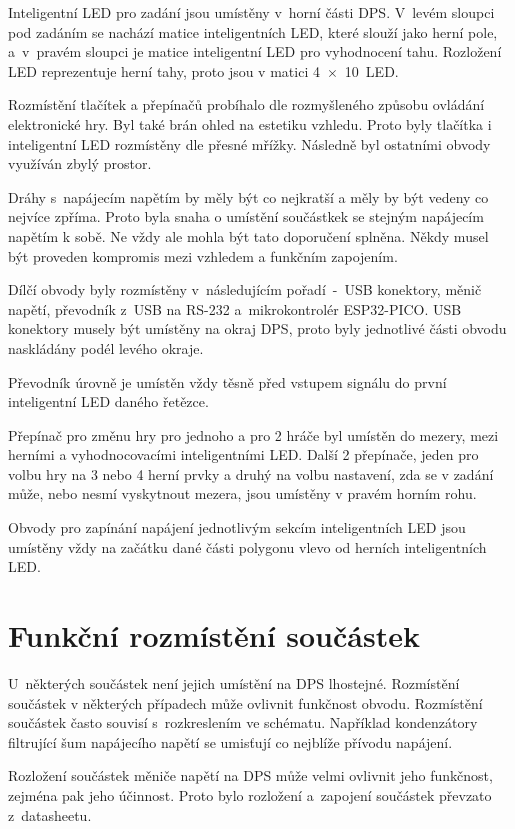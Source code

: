   Inteligentní LED pro zadání jsou umístěny v~horní části DPS. V~levém sloupci pod zadáním se nachází matice inteligentních LED, které slouží jako herní 
  pole, a~v~pravém sloupci je matice inteligentní LED pro vyhodnocení tahu. Rozložení LED reprezentuje herní tahy, proto jsou v matici 4~$\times$~10~LED.
  
  Rozmístění tlačítek a přepínačů probíhalo dle 
  rozmyšleného způsobu ovládání elektronické hry. Byl také brán ohled na estetiku vzhledu. Proto byly tlačítka i inteligentní LED
  rozmístěny dle přesné mřížky. Následně byl ostatními obvody využíván zbylý prostor. 

  Dráhy s~napájecím napětím by měly být co nejkratší a měly by být vedeny co nejvíce zpříma. Proto byla snaha o umístění součástkek
  se stejným napájecím napětím k sobě. Ne vždy ale mohla být tato doporučení splněna. Někdy musel být proveden kompromis mezi vzhledem a funkčním 
  zapojením. 

  Dílčí obvody byly rozmístěny v~následujícím pořadí~-~USB konektory, měnič napětí, převodník z~USB 
  na RS-232 a~mikrokontrolér ESP32-PICO. USB konektory musely být umístěny na okraj DPS, proto byly jednotlivé části obvodu naskládány podél levého okraje.

  Převodník úrovně je umístěn vždy těsně před vstupem signálu do první inteligentní LED daného řetězce.

  Přepínač pro změnu hry pro jednoho a pro 2 hráče byl umístěn do mezery, mezi herními a vyhodnocovacími inteligentními LED. Další 2 přepínače, jeden 
  pro volbu hry na 3 nebo 4 herní prvky a druhý na volbu nastavení, zda se v zadání může, nebo nesmí vyskytnout mezera, jsou umístěny v pravém 
  horním rohu. 

  Obvody pro zapínání napájení jednotlivým sekcím inteligentních LED jsou umístěny vždy na začátku dané části polygonu vlevo od herních inteligentních
  LED.

  \section{Funkční rozmístění součástek}
  U~některých součástek není jejich umístění na DPS lhostejné. Rozmístění součástek v některých případech může ovlivnit funkčnost obvodu. 
  Rozmístění součástek často souvisí s~rozkreslením ve schématu. Například kondenzátory filtrující šum napájecího napětí se umisťují co nejblíže přívodu 
  napájení.

  Rozložení součástek měniče napětí na DPS může velmi ovlivnit jeho funkčnost, zejména pak jeho účinnost. Proto bylo rozložení a~zapojení součástek 
  převzato z~datasheetu.

